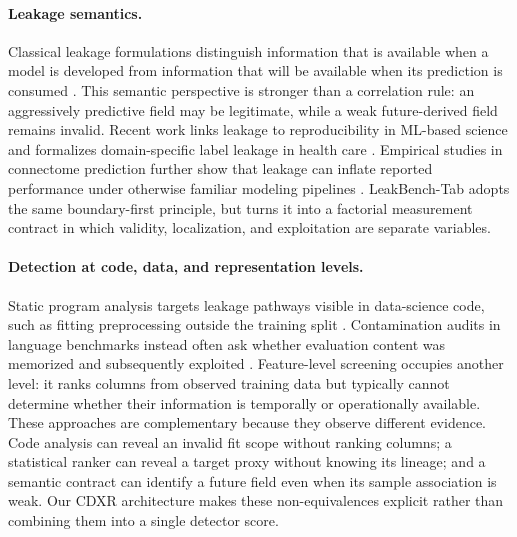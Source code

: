 \documentclass[sigconf,review]{acmart}
\begin{document}
\paragraph{Leakage semantics.}
Classical leakage formulations distinguish information that is available when
a model is developed from information that will be available when its
prediction is consumed \cite{kaufman2011leakage}. This semantic perspective is
stronger than a correlation rule: an aggressively predictive field may be
legitimate, while a weak future-derived field remains invalid. Recent work
links leakage to reproducibility in ML-based science \cite{kapoor2023leakage}
and formalizes domain-specific label leakage in health care
\cite{davis2024framework}. Empirical studies in connectome
prediction further show that leakage can inflate reported performance under
otherwise familiar modeling pipelines \cite{rosenblatt2024connectome}.
LeakBench-Tab adopts the same boundary-first principle, but turns it into a
factorial measurement contract in which validity, localization, and
exploitation are separate variables.

\paragraph{Detection at code, data, and representation levels.}
Static program analysis targets leakage pathways visible in data-science code,
such as fitting preprocessing outside the training split
\cite{subotic2022static}. Contamination audits in language benchmarks instead
often ask whether evaluation content was memorized and subsequently exploited
\cite{magar2022contamination}. Feature-level screening occupies another level:
it ranks columns from observed training data but typically cannot determine
whether their information is temporally or operationally available. These
approaches are complementary because they observe different evidence. Code
analysis can reveal an invalid fit scope without ranking columns; a statistical
ranker can reveal a target proxy without knowing its lineage; and a semantic
contract can identify a future field even when its sample association is weak.
Our CDXR architecture makes these non-equivalences explicit rather than
combining them into a single detector score.
\end{document}
